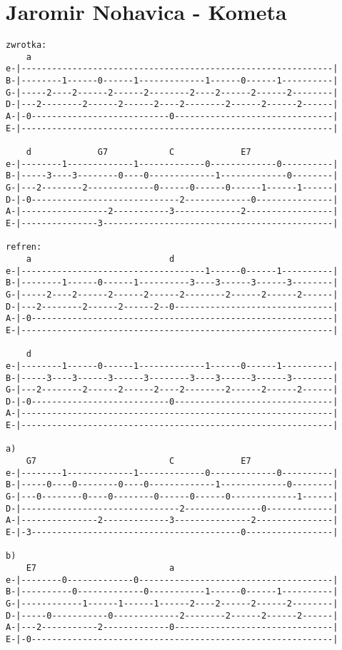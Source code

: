 \section{Jaromir Nohavica - Kometa}
\begin{verbatim}
zwrotka:
    a               
e-|-------------------------------------------------------------|
B-|--------1------0------1-------------1------0------1----------|
G-|-----2----2------2------2--------2----2------2------2--------|
D-|---2--------2------2------2----2--------2------2------2------|
A-|-0---------------------------0-------------------------------|
E-|-------------------------------------------------------------|

    d             G7            C             E7
e-|--------1-------------1-------------0-------------0----------|
B-|-----3----3--------0----0-------------1-------------0--------|
G-|---2--------2-------------0------0------0------1------1------|
D-|-0-----------------------------2-------------0---------------|
A-|-----------------2-----------3-------------2-----------------|
E-|---------------3---------------------------------------------|

refren:
    a                           d
e-|------------------------------------1------0------1----------|
B-|--------1------0------1----------3----3------3------3--------|
G-|-----2----2------2------2------2--------2------2------2------|
D-|---2--------2------2------2--0-------------------------------|
A-|-0-----------------------------------------------------------|
E-|-------------------------------------------------------------|

    d
e-|--------1------0------1-------------1------0------1----------|
B-|-----3----3------3------3--------3----3------3------3--------|
G-|---2--------2------2------2----2--------2------2------2------|
D-|-0---------------------------0-------------------------------|
A-|-------------------------------------------------------------|
E-|-------------------------------------------------------------|

a)
    G7                          C             E7
e-|--------1-------------1-------------0-------------0----------|
B-|-----0----0--------0----0-------------1-------------0--------|
G-|---0--------0----0--------0------0------0-------------1------|
D-|-------------------------------2---------------0-------------|
A-|---------------2-------------3---------------2---------------|
E-|-3-----------------------------------------0-----------------|

b)
    E7                          a
e-|--------0-------------0--------------------------------------|
B-|----------0-------------0-----------1------0------1----------|
G-|------------1------1------1------2----2------2------2--------|
D-|-----0-----------0-------------2--------2------2------2------|
A-|---2-----------2-------------0-------------------------------|
E-|-0-----------------------------------------------------------|
\end{verbatim}
